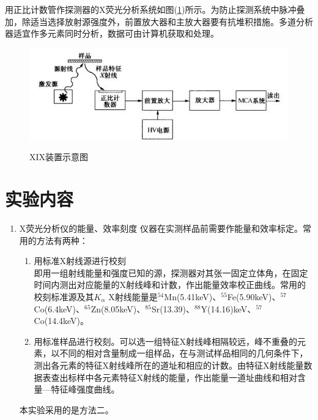 \documentclass[a4paper]{article}
\begin{document}
用正比计数管作探测器的X荧光分析系统如图(\ref{XIXdevice})所示。为防止探测系统中脉冲叠加，除适当选择放射源强度外，前置放大器和主放大器要有抗堆积措施。多道分析器适宜作多元素同时分析，数据可由计算机获取和处理。
\begin{figure}[H]
\centering
\includegraphics[width=12cm]{fig/6.jpg}\\
\caption{XIX装置示意图}\label{XIXdevice}
\end{figure}

\section{实验内容}
\begin{enumerate}
\item X荧光分析仪的能量、效率刻度
仪器在实测样品前需要作能量和效率标定。常用的方法有两种：
\begin{enumerate}
\item 用标准X射线源进行校刻\\
即用一组射线能量和强度已知的源，探测器对其张一固定立体角，在固定时间内测出对应能量的X射线峰和计数，作出能量效率校正曲线。常用的校刻标准源及其$K_{\alpha}$ X射线能量是$^{54}$Mn(5.41keV)、$^{55}$Fe(5.90keV)、$^{57}$Co(6.4keV)、$^{65}$Zn(8.05keV)、$^{85}$Sr(13.39)、$^{88}$Y(14.16)keV、$^{57}$Co(14.4keV)。
\item 用标准样品进行校刻。可以选一组特征X射线峰相隔较远，峰不重叠的元素，以不同的相对含量制成一组样品，在与测试样品相同的几何条件下，测出各元素的特征X射线峰所在的道址和相应的计数。由特征X射线能量数据表查出标样中各元素特征X射线的能量，作出能量一道址曲线和相对含量—特征峰强度曲线。
\end{enumerate}
本实验采用的是方法二。
\end{enumerate}
\end{document}
